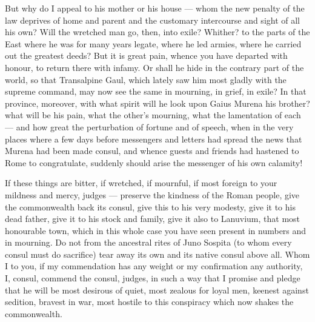  But why do I appeal to his mother or his house --- whom the new penalty of the law deprives of home and parent and the customary intercourse and sight of all his own? Will the wretched man go, then, into exile? Whither? to the parts of the East where he was for many years legate, where he led armies, where he carried out the greatest deeds? But it is great pain, whence you have departed with honour, to return there with infamy. Or shall he hide in the contrary part of the world, so that Transalpine Gaul, which lately saw him most gladly with the supreme command, may now see the same in mourning, in grief, in exile? In that province, moreover, with what spirit will he look upon Gaius Murena his brother? what will be his pain, what the other's mourning, what the lamentation of each --- and how great the perturbation of fortune and of speech, when in the very places where a few days before messengers and letters had spread the news that Murena had been made consul, and whence guests and friends had hastened to Rome to congratulate, suddenly should arise the messenger of his own calamity!

 If these things are bitter, if wretched, if mournful, if most foreign to your mildness and mercy, judges --- preserve the kindness of the Roman people, give the commonwealth back its consul, give this to his very modesty, give it to his dead father, give it to his stock and family, give it also to Lanuvium, that most honourable town, which in this whole case you have seen present in numbers and in mourning. Do not from the ancestral rites of Juno Sospita (to whom every consul must do sacrifice) tear away its own and its native consul above all. Whom I to you, if my commendation has any weight or my confirmation any authority, I, consul, commend the consul, judges, in such a way that I promise and pledge that he will be most desirous of quiet, most zealous for loyal men, keenest against sedition, bravest in war, most hostile to this conspiracy which now shakes the commonwealth.

